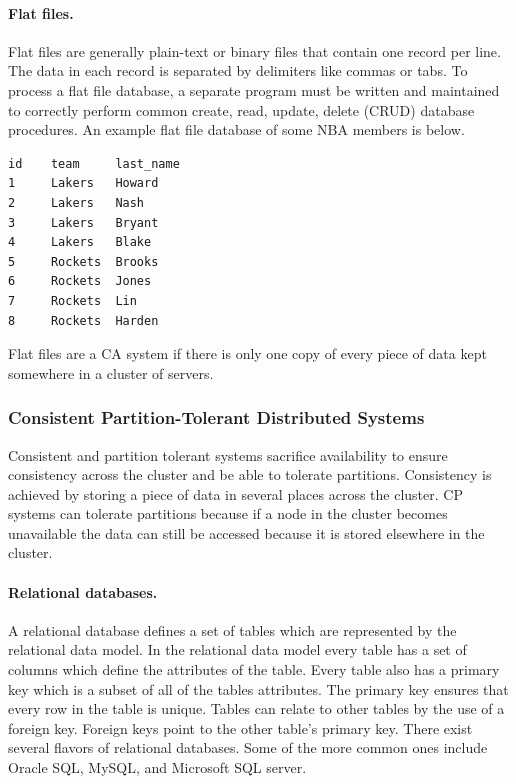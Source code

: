 \documentclass[12pt]{ucthesis}
\begin{document}
\paragraph{Flat files.}
Flat files are generally plain-text or binary files that contain one record per line. The data in each record is separated by delimiters like commas or tabs. To process a flat file database, a separate program must be written and maintained to correctly perform common create, read, update, delete (CRUD) database procedures. An example flat file database of some NBA members is below.


\begin{framed}
\begin{verbatim}
id    team     last_name
1     Lakers   Howard
2     Lakers   Nash
3     Lakers   Bryant
4     Lakers   Blake
5     Rockets  Brooks
6     Rockets  Jones
7     Rockets  Lin
8     Rockets  Harden
\end{verbatim}
\end{framed}

Flat files are a CA system if there is only one copy of every piece of data kept somewhere in a cluster of servers. 

\subsubsection{Consistent Partition-Tolerant Distributed Systems}

Consistent and partition tolerant systems sacrifice availability to ensure consistency across the cluster
and be able to tolerate partitions. Consistency is achieved by storing a piece of data in several places across
the cluster. CP systems can tolerate partitions because if a node in the cluster becomes unavailable the data
can still be accessed because it is stored elsewhere in the cluster.


\paragraph{Relational databases.}

A relational database defines a set of tables which are represented by the relational data model. In the
relational data model every table has a set of columns which define the attributes of the table. Every table
also has a primary key which is a subset of all of the tables attributes. The primary key ensures that
every row in the table is unique. Tables can relate to other tables by the use of a foreign key. Foreign keys
point to the other table's primary key. There exist several flavors of relational databases. Some of the more common ones include Oracle SQL, MySQL, and Microsoft SQL server.
\end{document}

